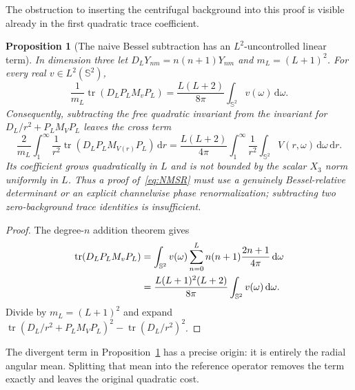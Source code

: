 \documentclass[11pt]{article}
\newcommand{\dd}{\,\mathrm d}
\DeclareMathOperator{\tr}{tr}
\newtheorem{proposition}[theorem]{Proposition}
\theoremstyle{definition}
\theoremstyle{remark}
\begin{document}
The obstruction to inserting the centrifugal background into this proof is
visible already in the first quadratic trace coefficient.

\begin{proposition}[The naive Bessel subtraction has an $L^2$-uncontrolled
linear term]
\label{prop:naive-Bessel-cross-term}
In dimension three let
$D_LY_{nm}=n(n+1)Y_{nm}$ and $m_L=(L+1)^2$.  For every real
$v\in L^2(\mathbb S^2)$,
\begin{equation}
 \frac1{m_L}\tr\!\left(D_LP_LM_vP_L\right)
 =\frac{L(L+2)}{8\pi}\int_{\mathbb S^2}v(\omega)\dd\omega.
 \label{eq:exact-Bessel-cross-trace}
\end{equation}
Consequently, subtracting the free quadratic invariant from the invariant for
$D_L/r^2+P_LM_VP_L$ leaves the cross term
\begin{equation}
 \frac{2}{m_L}\int_1^\infty\frac1{r^2}
   \tr\!\left(D_LP_LM_{V(r)}P_L\right)\dd r
 =\frac{L(L+2)}{4\pi}
   \int_1^\infty\frac1{r^2}
     \int_{\mathbb S^2}V(r,\omega)\dd\omega\dd r.
 \label{eq:divergent-Bessel-cross-term}
\end{equation}
Its coefficient grows quadratically in $L$ and is not bounded by the scalar
$X_3$ norm uniformly in $L$.  Thus a proof of~\eqref{eq:NMSR} must use a
genuinely Bessel-relative determinant or an explicit channelwise phase
renormalization; subtracting two zero-background trace identities is
insufficient.
\end{proposition}

\begin{proof}
The degree-$n$ addition theorem gives
\begin{align}
 \tr(D_LP_LM_vP_L)
 &=\int_{\mathbb S^2}v(\omega)
   \sum_{n=0}^Ln(n+1)\frac{2n+1}{4\pi}\dd\omega\notag\\
 &=\frac{L(L+1)^2(L+2)}{8\pi}
   \int_{\mathbb S^2}v(\omega)\dd\omega.
\end{align}
Divide by $m_L=(L+1)^2$ and expand
$\tr(D_L/r^2+P_LM_VP_L)^2-\tr(D_L/r^2)^2$.
\end{proof}

The divergent term in Proposition~\ref{prop:naive-Bessel-cross-term} has a
precise origin: it is entirely the radial angular mean.  Splitting that mean
into the reference operator removes the term exactly and leaves the original
quadratic cost.
\end{document}

